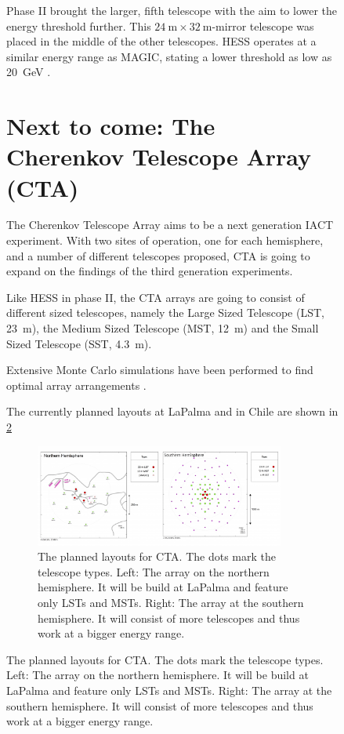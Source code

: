 \begin{figure}
Phase II brought the larger, fifth telescope with the aim to lower the energy threshold
further. This $\SI{24}{\meter} \times \SI{32}{\meter}$-mirror telescope 
was placed in the middle of the other telescopes.
HESS operates at a similar energy range as MAGIC, stating a lower threshold as low as 
\SI{20}{\giga\electronvolt} \cite{vincent2005hess}.


\section{Next to come: The Cherenkov Telescope Array (CTA)}
\label{sec:cta}

The Cherenkov Telescope Array aims to be a next generation IACT experiment.
With two sites of operation, one for each hemisphere, and a number of different 
telescopes proposed, CTA is going to expand on the findings of the third 
generation experiments.

Like HESS in phase II, the CTA arrays are going to consist of different sized telescopes, namely
the Large Sized Telescope (LST, \SI{23}{\meter}), 
the Medium Sized Telescope (MST, \SI{12}{\meter}) 
and the Small Sized Telescope (SST, \SI{4.3}{\meter}).

Extensive Monte Carlo simulations have been performed to find optimal array arrangements
\cite{BERNLOHR2013171}.

The currently planned layouts at LaPalma and in Chile are shown in 
\ref{fig:cta_layout}

\begin{figure}
	\center
	\captionsetup{width=0.9\linewidth}
	\includegraphics[width=0.9\textwidth]{images/cta_layout.png}
	\caption{The planned layouts for CTA. The dots mark the telescope types.
	Left: The array on the northern hemisphere. It will be build at LaPalma
	and feature only LSTs and MSTs.
	Right: The array at the southern hemisphere.
	It will consist of more telescopes and thus 
	work at a bigger energy range.
	\cite{cta_web}}
	\label{fig:cta_layout}
\end{figure}



\end{figure}
